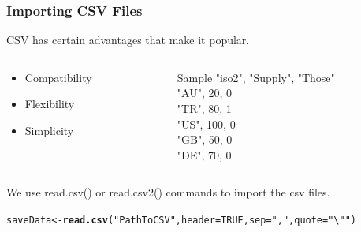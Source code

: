 \documentclass{beamer}\usepackage[]{graphicx}\usepackage[]{color}
\makeatletter
\newcommand{\hlnum}[1]{\textcolor[rgb]{0.686,0.059,0.569}{#1}}%
\newcommand{\hlstr}[1]{\textcolor[rgb]{0.192,0.494,0.8}{#1}}%
\newcommand{\hlstd}[1]{\textcolor[rgb]{0.345,0.345,0.345}{#1}}%
\newcommand{\hlkwb}[1]{\textcolor[rgb]{0.69,0.353,0.396}{#1}}%
\newcommand{\hlkwc}[1]{\textcolor[rgb]{0.333,0.667,0.333}{#1}}%
\newcommand{\hlkwd}[1]{\textcolor[rgb]{0.737,0.353,0.396}{\textbf{#1}}}%
\newenvironment{kframe}{%
 \def\at@end@of@kframe{}%
 \ifinner\ifhmode%
  \def\at@end@of@kframe{\end{minipage}}%
  \begin{minipage}{\columnwidth}%
 \fi\fi%
 \def\FrameCommand##1{\hskip\@totalleftmargin \hskip-\fboxsep
 \colorbox{shadecolor}{##1}\hskip-\fboxsep
     \hskip-\linewidth \hskip-\@totalleftmargin \hskip\columnwidth}%
 \MakeFramed {\advance\hsize-\width
   \@totalleftmargin\z@ \linewidth\hsize
   \@setminipage}}%
 {\par\unskip\endMakeFramed%
 \at@end@of@kframe}
\newenvironment{knitrout}{}{} %
\makeatother
\begin{document}
\begin{frame}[fragile]
\frametitle{Importing CSV Files}

CSV has certain advantages that make it popular.

\begin{columns}[T]
	\begin{column}{.5\textwidth}
		\begin{itemize}
		\vspace{1.5em}
		\item Compatibility
		\item Flexibility
		\item Simplicity
		\end{itemize}
	\end{column}
	\begin{column}{.5\textwidth}
		\begin{alertblock}{Sample}
		{\scriptsize
		"iso2", "Supply", "Those" \\
		"AU",         20,       0 \\
		"TR",         80,       1 \\
		"US",        100,       0 \\
		"GB",         50,       0 \\
		"DE",         70,       0 \\
		}
		\end{alertblock}
	\end{column}
\end{columns}

\vspace{1em}
We use read.csv() or read.csv2() commands to import the csv files.

\begin{knitrout}\scriptsize
{}\color{fgcolor}\begin{kframe}
\begin{alltt}
\hlstd{saveData} \hlkwb{<-} \hlkwd{read.csv}\hlstd{(}\hlstr{"PathToCSV"}\hlstd{,} \hlkwc{header} \hlstd{=} \hlnum{TRUE}\hlstd{,} \hlkwc{sep} \hlstd{=} \hlstr{","}\hlstd{,} \hlkwc{quote} \hlstd{=} \hlstr{"\textbackslash{}""}\hlstd{)}
\end{alltt}
\end{kframe}
\end{knitrout}

\end{frame}
\end{document}
